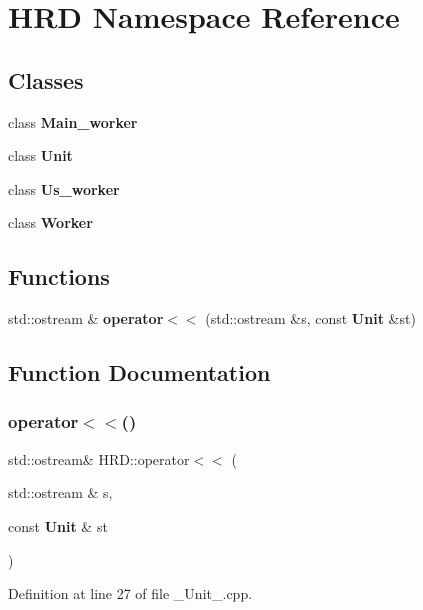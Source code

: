 \section{H\+RD Namespace Reference}
\label{namespace_h_r_d}
\subsection*{Classes}
\begin{DoxyCompactItemize}
\item 
class \textbf{ Main\+\_\+worker}
\item 
class \textbf{ Unit}
\item 
class \textbf{ Us\+\_\+worker}
\item 
class \textbf{ Worker}
\end{DoxyCompactItemize}
\subsection*{Functions}
\begin{DoxyCompactItemize}
\item 
std\+::ostream \& \textbf{ operator$<$$<$} (std\+::ostream \&s, const \textbf{ Unit} \&st)
\end{DoxyCompactItemize}


\subsection{Function Documentation}
\mbox{\label{namespace_h_r_d_a018350b37eb43c0572045deb62311a9d}} 
\subsubsection{operator$<$$<$()}
{\footnotesize\ttfamily std\+::ostream\& H\+R\+D\+::operator$<$$<$ (\begin{DoxyParamCaption}\item[{std\+::ostream \&}]{s,  }\item[{const \textbf{ Unit} \&}]{st }\end{DoxyParamCaption})}



Definition at line 27 of file \+\_\+\+Unit\+\_\+.\+cpp.

